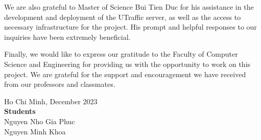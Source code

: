 \documentclass[a4paper]{article}
\begin{document}
We are also grateful to Master of Science Bui Tien Duc for his assistance in the development and deployment of the UTraffic server, as well as the access to necessary infrastructure for the project. His prompt and helpful responses to our inquiries have been extremely beneficial.

Finally, we would like to express our gratitude to the Faculty of Computer Science and Engineering for providing us with the opportunity to work on this project. We are grateful for the support and encouragement we have received from our professors and classmates.

\begin{flushright}
    Ho Chi Minh, December 2023 \\
    \textbf{Students} \\
    Nguyen Nho Gia Phuc \\
    Nguyen Minh Khoa
\end{flushright}


\newpage
\tableofcontents
\newpage
\listoffigures
\newpage
\listoftables
\newpage







\nocite{*}
\printbibliography
\end{document}
